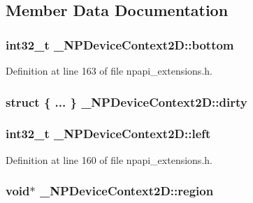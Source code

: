 \subsection{Member Data Documentation}
\hypertarget{struct___n_p_device_context2_d_ab3eff9d7c9a0261a12cd1ac819e70d4c}{
\subsubsection[{bottom}]{\setlength{\rightskip}{0pt plus 5cm}int32\_\-t {\bf \_\-NPDeviceContext2D::bottom}}}
\label{struct___n_p_device_context2_d_ab3eff9d7c9a0261a12cd1ac819e70d4c}


Definition at line 163 of file npapi\_\-extensions.h.

\hypertarget{struct___n_p_device_context2_d_a078b2be40725ea8e4b1b2c500872f9af}{
\subsubsection[{dirty}]{\setlength{\rightskip}{0pt plus 5cm}struct \{ ... \}   {\bf \_\-NPDeviceContext2D::dirty}}}
\label{struct___n_p_device_context2_d_a078b2be40725ea8e4b1b2c500872f9af}
\hypertarget{struct___n_p_device_context2_d_a45321ab6f6b7280f14e9f27472f6ff69}{
\subsubsection[{left}]{\setlength{\rightskip}{0pt plus 5cm}int32\_\-t {\bf \_\-NPDeviceContext2D::left}}}
\label{struct___n_p_device_context2_d_a45321ab6f6b7280f14e9f27472f6ff69}


Definition at line 160 of file npapi\_\-extensions.h.

\hypertarget{struct___n_p_device_context2_d_a8ec3c876c329a4b94c6ac730d2e33885}{
\subsubsection[{region}]{\setlength{\rightskip}{0pt plus 5cm}void$\ast$ {\bf \_\-NPDeviceContext2D::region}}}
\label{struct___n_p_device_context2_d_a8ec3c876c329a4b94c6ac730d2e33885}


